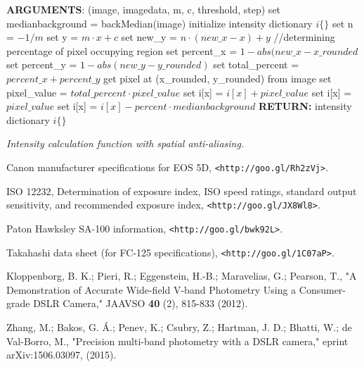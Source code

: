 \documentclass[prb,preprint]{revtex4-1}
\begin{document}
\begin{algorithm}[!h]
	\begin{algorithmic}
		\STATE \textbf{ARGUMENTS}: (image, imagedata, m, c, threshold, step)
		\STATE set medianbackground = backMedian(image)
		\STATE initialize intensity dictionary $i\{\}$
		\STATE set n = $-1 / m$\;
		\STATE set y = $m \cdot x + c $
		\STATE set new\_y = $n \cdot (new\_x - x) + y $
		\STATE //determining percentage of pixel occupying region
		\STATE set percent\_x = $1 - abs(new\_x - x\_rounded$
		\STATE set percent\_y = $1 - abs(new\_y - y\_rounded)$
		\STATE set total\_percent = $percent\_x + percent\_y$
		\STATE get pixel at (x\_rounded, y\_rounded) from 	image
		\STATE set pixel\_value = $total\_percent \cdot pixel\_value$
		\STATE set i[x] = $i[x] + pixel\_value$
		\ELSE
		\STATE set i[x] = $pixel\_value$
		\ENDIF
		\STATE set i[x] = $i[x] - percent \cdot median background$
		\ENDIF
		\ENDFOR
		\ENDFOR
		\ENDIF
		\ENDFOR
		\ENDFOR
		\STATE \textbf{RETURN:} intensity dictionary $i\{\}$
	\end{algorithmic}
	\caption{\emph{Intensity calculation function with spatial anti-aliasing.}}\label{alg:1}
\end{algorithm}

\begin{thebibliography}{99}
	
	 Canon manufacturer specifications for EOS 5D, \verb|<http://goo.gl/Rh2zVj>|.
	
	 ISO 12232, Determination of exposure index, ISO speed ratings, standard output sensitivity, and recommended exposure index, \verb|<http://goo.gl/JX8Wl8>|.
	
	 Paton Hawksley SA-100 information, \verb|<http://goo.gl/bwk92L>|.
	
	 Takahashi data sheet (for FC-125 specifications), \verb|<http://goo.gl/1C07aP>|.
	
	 Kloppenborg, B. K.; Pieri, R.; Eggenstein, H.-B.; Maravelias, G.; Pearson, T., "A Demonstration of Accurate Wide-field V-band Photometry Using a Consumer-grade DSLR Camera," JAAVSO \textbf{40} (2), 815-833 (2012).
	
	 Zhang, M.; Bakos, G. Á.; Penev, K.; Csubry, Z.; Hartman, J. D.; Bhatti, W.; de Val-Borro, M., "Precision multi-band photometry with a DSLR camera," eprint arXiv:1506.03097, (2015).
	
\end{thebibliography}
\end{document}
